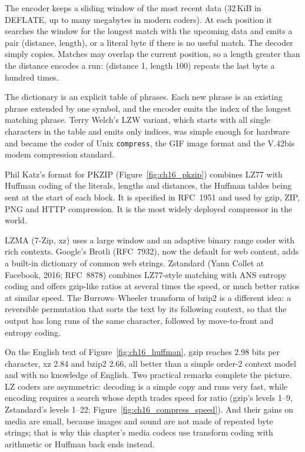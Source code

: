 \begin{description}[style=nextline,leftmargin=1.2em,font=\sffamily\bfseries\small\color{navy}]
\item[LZ77 (1977).] The encoder keeps a sliding window of the most recent data (32\,KiB in DEFLATE,
up to many megabytes in modern coders). At each position it searches the window for the longest
match with the upcoming data and emits a pair (distance, length), or a literal byte if there is no
useful match. The decoder simply copies. Matches may overlap the current position, so a length
greater than the distance encodes a run: (distance 1, length 100) repeats the last byte a hundred
times.
\item[LZ78 (1978) and LZW (1984).] The dictionary is an explicit table of phrases. Each new phrase
is an existing phrase extended by one symbol, and the encoder emits the index of the longest
matching phrase. Terry Welch's LZW variant, which starts with all single characters in the table
and emits only indices, was simple enough for hardware and became the coder of Unix
\texttt{compress}, the GIF image format and the V.42bis modem compression standard.
\item[DEFLATE (1993).] Phil Katz's format for PKZIP (Figure~\ref{fig:ch16_pkzip}) combines LZ77 with Huffman coding of the
literals, lengths and distances, the Huffman tables being sent at the start of each block. It is
specified in RFC~1951 and used by gzip, ZIP, PNG and HTTP compression. It is the most widely
deployed compressor in the world.
\item[Modern successors.] LZMA (7-Zip, xz) uses a large window and an adaptive binary range coder
with rich contexts. Google's Brotli (RFC~7932), now the default for web content, adds a built-in
dictionary of common web strings. Zstandard (Yann Collet at Facebook, 2016; RFC~8878) combines
LZ77-style matching with ANS entropy coding and offers gzip-like ratios at several times the
speed, or much better ratios at similar speed. The Burrows--Wheeler transform of bzip2 is a
different idea: a reversible permutation that sorts the text by its following context, so that
the output has long runs of the same character, followed by move-to-front and entropy coding.
\end{description}

On the English text of Figure~\ref{fig:ch16_huffman}, gzip reaches 2.98 bits per character, xz
2.84 and bzip2 2.66, all better than a simple order-2 context model and with no knowledge of
English. Two practical remarks complete the picture. LZ coders are asymmetric: decoding is a
simple copy and runs very fast, while encoding requires a search whose depth trades speed for
ratio (gzip's levels 1--9, Zstandard's levels 1--22; Figure~\ref{fig:ch16_compress_speed}). And
their gains on media are small, because images and sound are not made of repeated byte strings;
that is why this chapter's media codecs use transform coding with arithmetic or Huffman back ends
instead.

